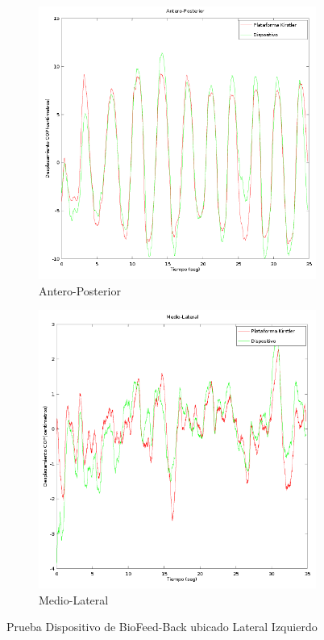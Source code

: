 \documentclass[12pt,a4paper]{article}
\newcommand{\nombreDispositivo}{Dispositivo de BioFeed-Back }
\begin{document}
	\begin{figure}[H]
		\centering
		\begin{subfigure}{.5\textwidth}
			\centering
			\includegraphics[width=1\linewidth]{images/pruebas/LateralIzquierdo/Antero-Posterior}
			\caption{Antero-Posterior}
			\label{fig:anteroPosteriorLateral}
		\end{subfigure}%
		\begin{subfigure}{.5\textwidth}
			\centering
			\includegraphics[width=1\linewidth]{images/pruebas/LateralIzquierdo/Medio-Lateral}
			\caption{Medio-Lateral}
			\label{fig:medioLateralIzquierdo}
		\end{subfigure}
		\caption{Prueba \nombreDispositivo ubicado Lateral Izquierdo}
		\label{fig:pruebaLateralIzquierdo}
	\end{figure}
	
\end{document}
